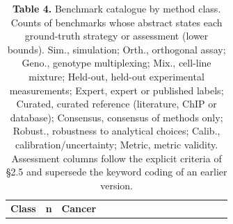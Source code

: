 \documentclass[11pt]{article}
\newenvironment{tablefont}{\par\scriptsize\setlength{\tabcolsep}{3.5pt}}{\par}
\newcommand{\thead}[1]{\textbf{#1}}
\begin{document}
\begin{tablefont}

\setlength{\tabcolsep}{2pt}
\begin{longtable}[l]{@{}
  >{\raggedright\arraybackslash}p{}
  >{\raggedright\arraybackslash}p{}
  >{\raggedright\arraybackslash}p{}
  >{\raggedright\arraybackslash}p{}
  >{\raggedright\arraybackslash}p{}
  >{\raggedright\arraybackslash}p{}
  >{\raggedright\arraybackslash}p{}
  >{\raggedright\arraybackslash}p{}
  >{\raggedright\arraybackslash}p{}
  >{\raggedright\arraybackslash}p{}
  >{\raggedright\arraybackslash}p{}
  >{\raggedright\arraybackslash}p{}
  >{\raggedright\arraybackslash}p{}
  >{\raggedright\arraybackslash}p{}
  >{\raggedright\arraybackslash}p{}
  >{\raggedright\arraybackslash}p{}@{}}
\caption{\textbf{Table 4.} Benchmark catalogue by method class. Counts of
benchmarks whose abstract states each ground-truth strategy or
assessment (lower bounds). Sim., simulation; Orth., orthogonal assay;
Geno., genotype multiplexing; Mix., cell-line mixture; Held-out,
held-out experimental measurements; Expert, expert or published labels;
Curated, curated reference (literature, ChIP or database); Consensus,
consensus of methods only; Robust., robustness to analytical choices;
Calib., calibration/uncertainty; Metric, metric validity. Assessment
columns follow the explicit criteria of §2.5 and supersede the keyword
coding of an earlier version.}\tabularnewline
\toprule
\begin{minipage}[b]{\linewidth}\raggedright
\thead{Class}
\end{minipage} & \begin{minipage}[b]{\linewidth}\raggedright
\thead{n}
\end{minipage} & \begin{minipage}[b]{\linewidth}\raggedright
\thead{Cancer}
\end{minipage} & \begin{minipage}[b]{\linewidth}\raggedright

\end{minipage}
\end{longtable}
\end{tablefont}
\end{document}

